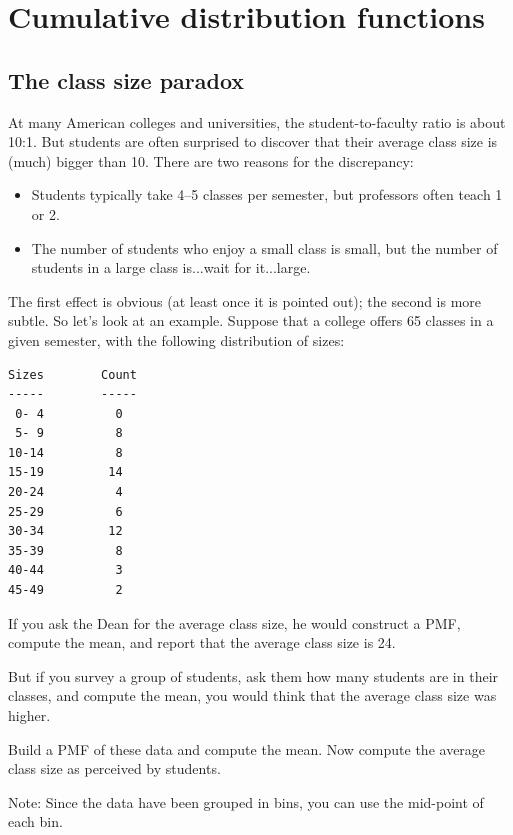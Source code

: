 \documentclass[12pt]{book}
\begin{document}
\chapter{Cumulative distribution functions}
\label{cumulative}

\section{The class size paradox}

At many American colleges and universities, the student-to-faculty
ratio is about 10:1.  But students are often surprised to discover
that their average class size is (much) bigger than 10.  There
are two reasons for the discrepancy:

\begin{itemize}

\item Students typically take 4--5 classes per semester, but
professors often teach 1 or 2.

\item The number of students who enjoy a small class is small,
but the number of students in a large class is...wait for it...large.

\end{itemize}

The first effect is obvious (at least once it is pointed out);
the second is more subtle.  So let's look at an example.  Suppose
that a college offers 65 classes in a given semester, with the
following distribution of sizes:

\begin{verbatim}
Sizes        Count
-----        -----
 0- 4          0
 5- 9          8
10-14          8
15-19         14
20-24          4
25-29          6
30-34         12
35-39          8
40-44          3
45-49          2
\end{verbatim}

If you ask the Dean for the average class size, he would
construct a PMF, compute the mean, and report that the
average class size is 24.

But if you survey a group of students, ask them how many
students are in their classes, and compute the mean, you would
think that the average class size was higher.

\begin{ex}
Build a PMF of these data and compute the mean.  Now compute the
average class size as perceived by students.

Note: Since the data have been grouped in bins, you can use the
mid-point of each bin.
\end{ex}
\end{document}
